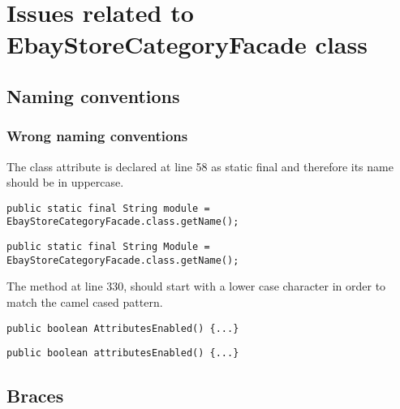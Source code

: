 \chapter{Issues related to EbayStoreCategoryFacade class}

\section{Naming conventions}
\subsection{Wrong naming conventions}
The class attribute  is declared at line 58 as static final and therefore its name should be in uppercase.
\begin{lstlisting}[firstnumber=58, caption={Issue}]
public static final String module = EbayStoreCategoryFacade.class.getName();
\end{lstlisting}
\begin{lstlisting}[firstnumber=58, caption={Possible solution}]
public static final String Module = EbayStoreCategoryFacade.class.getName();
\end{lstlisting}
The method  at line 330, should start with a lower case character in order to match the camel cased pattern.
\begin{lstlisting}[firstnumber=330, caption={Issue}]
public boolean AttributesEnabled() {...}
\end{lstlisting}
\begin{lstlisting}[firstnumber=36, caption={Possible solution}]
public boolean attributesEnabled() {...}
\end{lstlisting}

\section{Braces}

